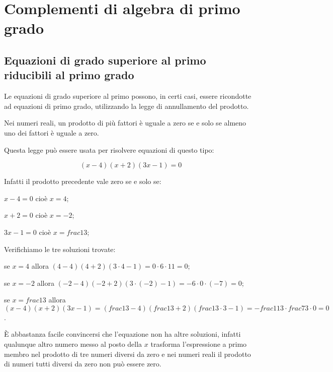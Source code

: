 
\chapter{Complementi di algebra di primo grado}

\section{Equazioni di grado superiore al primo riducibili al primo grado}
\label{sec:compl1_eqgradosup}

Le equazioni di grado superiore al primo possono, in certi casi, essere 
ricondotte ad equazioni di primo grado, utilizzando la legge di annullamento 
del prodotto.

\begin{definizione}
 Nei numeri reali, un prodotto di più fattori è uguale a zero se e solo se 
 almeno uno dei fattori è uguale a zero.
\end{definizione}

Questa legge può essere usata per risolvere equazioni di questo tipo:

\[(x-4)(x+2)(3x-1)=0\]

Infatti il prodotto precedente vale zero se e solo se:

\begin{itemize*}
 \item $x-4=0$ cioè $x=4$;
 \item $x+2=0$ cioè $x=-2$;
 \item $3x-1=0$ cioè $x=frac{1}{3}$;
\end{itemize*}

Verifichiamo le tre soluzioni trovate:

\begin{itemize*}
 \item se $x=4$ allora $(4-4)(4+2)(3 \cdot 4-1)=0 \cdot 6 \cdot 11=0$;
 \item se $x=-2$ allora $(-2-4)(-2+2)(3 \cdot (-2)-1)=-6 \cdot 0 \cdot (-7)=0$;
 \item se $x=frac{1}{3}$ allora $(x-4)(x+2)(3x-1)=
           (frac{1}{3}-4)(frac{1}{3}+2)(frac{1}{3} \cdot 3 -1)=
           -frac{11}{3} \cdot frac{7}{3} \cdot 0 =0$.
\end{itemize*}

È abbastanza facile convincersi che l'equazione non ha altre soluzioni, 
infatti qualunque altro numero messo al posto della $x$ trasforma 
l'espressione a primo membro nel prodotto di tre numeri diversi da zero e nei
numeri reali il prodotto di numeri tutti diversi da zero non può essere zero.

